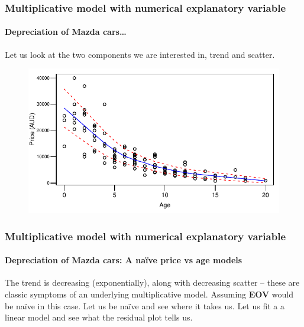 \documentclass{beamer}\usepackage[]{graphicx}\usepackage[]{xcolor}
\begin{document}
\begin{frame}[fragile]
\frametitle{Multiplicative model with numerical explanatory variable}
\framesubtitle{Depreciation of Mazda cars\ldots}
Let us look at the two components we are interested in, trend and scatter. 



\begin{figure}
  \centering
  \includegraphics{figure/RC-H06-022}
\end{figure}

\end{frame}


\begin{frame}[fragile]
\frametitle{Multiplicative model with numerical explanatory variable}
\framesubtitle{Depreciation of Mazda cars: A na\"ive price vs age models}
The trend is decreasing (exponentially), along with decreasing scatter -- these are classic symptoms of an underlying multiplicative model. Assuming \textbf{EOV} would be na\"ive in this case. Let us be na\"ive and see where it takes us. Let us fit a a linear model and see what the residual plot tells us.

\end{frame}
\end{document}
